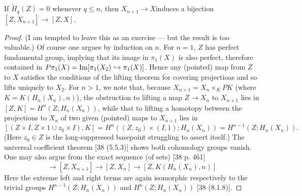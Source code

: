 \begin{corollary}
   If $\widetilde{H}_q(Z) = 0$ whenever $q\leqslant n$, then $X_{n+1}\longrightarrow X$induces a bijection $[Z,X_{n+1}] \longrightarrow [Z,X]$.
 \end{corollary} 
 \begin{proof}
  (I am tempted to leave this as an exercise --- but the result is too valuable.) Of course one argues by induction on $n$. For $n = 1$, $Z$ has perfect fundamental group, implying that its image in $\pi_1 (X)$ is also perfect, therefore contained in $P\pi_1 (X) = \mathrm{Im}[\pi_1 (X_2) \hookrightarrow \pi_1 (X)]$. Hence any (pointed) map from $Z$ to $X$ satisfies the conditions of the lifting theorem for covering projectioas and so lifts uniquely to  $X_2$. For $n > 1$, we note that, because $X_{n+1} = X_n \times_K PK$ (where $K =K(H_n(X_n), n)$), the obstruction to lifting a map $Z \longrightarrow X_n$ to $X_{n+1}$ lies in $[Z,K] = H^n(Z; H_n(X_n))$, while that to lifting a homotopy between the projections to $X_n $ of two given (pointed) maps to $X_{n+1}$ lies in
\[[(Z\times I,Z\times 1 \cup z_0\times I),K] =H^n((Z,z_0)\times (I,1); H_n(X_n)) = H^{n-1}(Z;H_n(X_n)).\]
(Here $z_0\in Z$ is the long-suppressed basepoint struggling to assert itself.) The universal coefficient theorem [38 (5.5.3)] shows both cohomology groups vanish. One may also argue from the exact sequence (of sets) [38 p. 461]
\begin{equation}
  [Z, K(H_n(X_n), n-1)]\longrightarrow[Z, X_{n+1}]\longrightarrow [Z, X_n] \longrightarrow [Z, K(H_n(X_n), n)]
\end{equation}
Here the extreme left and right terms are again isomorphic respectively to the trivial groups $H^{n-1} (Z; H_n(X_n))$ and $H^n(Z;H_n(X_n))$ [38 (8.1.8)].
 \end{proof}
 
